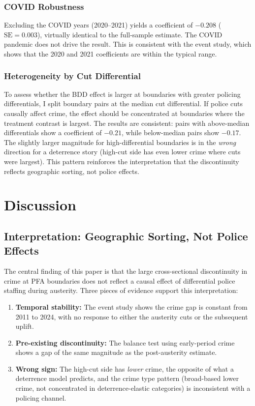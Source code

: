 \documentclass[12pt]{article}
\begin{document}
\subsubsection{COVID Robustness}

Excluding the COVID years (2020--2021) yields a coefficient of $-0.208$ ($\text{SE} = 0.003$), virtually identical to the full-sample estimate. The COVID pandemic does not drive the result. This is consistent with the event study, which shows that the 2020 and 2021 coefficients are within the typical range.

\subsubsection{Heterogeneity by Cut Differential}

To assess whether the BDD effect is larger at boundaries with greater policing differentials, I split boundary pairs at the median cut differential. If police cuts causally affect crime, the effect should be concentrated at boundaries where the treatment contrast is largest. The results are consistent: pairs with above-median differentials show a coefficient of $-0.21$, while below-median pairs show $-0.17$. The slightly larger magnitude for high-differential boundaries is in the \textit{wrong} direction for a deterrence story (high-cut side has even lower crime where cuts were largest). This pattern reinforces the interpretation that the discontinuity reflects geographic sorting, not police effects.


\section{Discussion}

\subsection{Interpretation: Geographic Sorting, Not Police Effects}

The central finding of this paper is that the large cross-sectional discontinuity in crime at PFA boundaries does not reflect a causal effect of differential police staffing during austerity. Three pieces of evidence support this interpretation:

\begin{enumerate}
    \item \textbf{Temporal stability:} The event study shows the crime gap is constant from 2011 to 2024, with no response to either the austerity cuts or the subsequent uplift.
    \item \textbf{Pre-existing discontinuity:} The balance test using early-period crime shows a gap of the same magnitude as the post-austerity estimate.
    \item \textbf{Wrong sign:} The high-cut side has \textit{lower} crime, the opposite of what a deterrence model predicts, and the crime type pattern (broad-based lower crime, not concentrated in deterrence-elastic categories) is inconsistent with a policing channel.
\end{enumerate}
\end{document}
